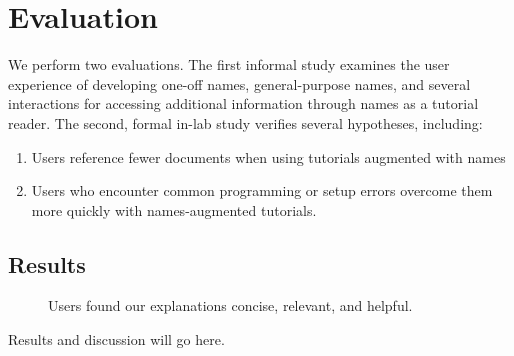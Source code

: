 \section{Evaluation}

We perform two evaluations.
The first informal study examines the user experience of developing one-off \glspl{name}, general-purpose \glspl{name}, and several interactions for accessing additional information through \glspl{name} as a tutorial reader.
The second, formal in-lab study verifies several hypotheses, including:
\noindent
\begin{enumerate}%
\item Users reference fewer documents when using tutorials augmented with \glspl{name}
\item Users who encounter common programming or setup errors overcome them more quickly with \glspl{name}-augmented tutorials.
\end{enumerate}

\subsection{Results}

\begin{figure}
\caption{Users found our explanations concise, relevant, and helpful.}
\label{fig:user_study_bar}
\end{figure}

Results and discussion will go here.
